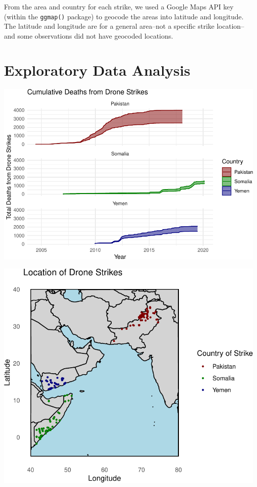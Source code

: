 \documentclass[
]{article}
\begin{document}
From the area and country for each strike, we used a Google Maps API key
(within the \texttt{ggmap()} package) to geocode the areas into latitude
and longitude. The latitude and longitude are for a general area--not a
specific strike location--and some observations did not have geocoded
locations.

\hypertarget{exploratory-data-analysis}{%
\section{Exploratory Data Analysis}\label{exploratory-data-analysis}}

\begin{center}\includegraphics[width=0.75\linewidth]{strike-report_files/figure-latex/strike-deaths-1} \end{center}

\begin{center}\includegraphics[width=0.75\linewidth]{strike-report_files/figure-latex/strike-location-1} \end{center}
\end{document}
